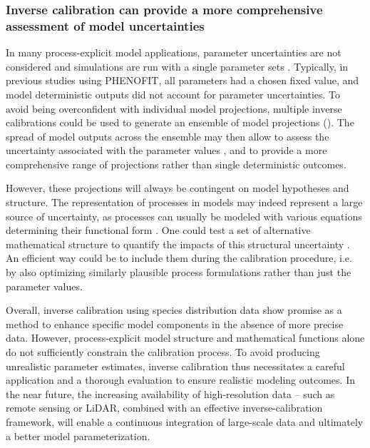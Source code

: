 \clearpage

\subsubsection{Inverse calibration can provide a more comprehensive assessment of model uncertainties}

In many process-explicit model applications, parameter uncertainties are not considered and simulations are run with a single parameter sets \citep{Niu2014, Lobell2010}. Typically, in previous studies using PHENOFIT, all parameters had a chosen fixed value, and model deterministic outputs did not account for parameter uncertainties. To avoid being overconfident with individual model projections, multiple inverse calibrations could be used to generate an ensemble of model projections (). The spread of model outputs across the ensemble may then allow to assess the uncertainty associated with the parameter values \citep{Simmonds2024}, and to provide a more comprehensive range of projections rather than single deterministic outcomes.

However, these projections will always be contingent on model hypotheses and structure. The representation of processes in models may indeed represent a large source of uncertainty, as processes can usually be modeled with various equations determining their functional form \citep{Keenan2011b}. One could test a set of alternative mathematical structure to quantify the impacts of this structural uncertainty \citep{Huber2020}. An efficient way could be to include them during the calibration procedure, i.e. by also optimizing similarly plausible process formulations rather than just the parameter values.

Overall, inverse calibration using species distribution data show promise as a method to enhance specific model components in the absence of more precise data. However, process-explicit model structure and mathematical functions alone do not sufficiently constrain the calibration process. To avoid producing unrealistic parameter estimates, inverse calibration thus necessitates a careful application and a thorough evaluation to ensure realistic modeling outcomes. In the near future, the increasing availability of high-resolution data -- such as remote sensing or LiDAR, combined with an effective inverse-calibration framework, will enable a continuous integration of large-scale data and ultimately a better model parameterization.